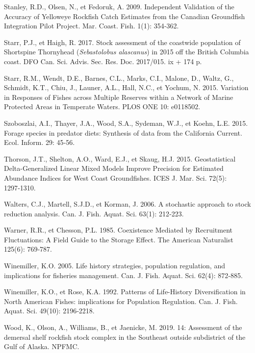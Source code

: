 \documentclass[french,11pt]{book}
\begin{document}
\leavevmode\hypertarget{ref-stanley2009}{}%
Stanley, R.D., Olsen, N., et Fedoruk, A. 2009. Independent Validation of the Accuracy of Yelloweye Rockfish Catch Estimates from the Canadian Groundfish Integration Pilot Project. Mar. Coast. Fish. 1(1): 354‑362.

\leavevmode\hypertarget{ref-starr2017}{}%
Starr, P.J., et Haigh, R. 2017. Stock assessment of the coastwide population of Shortspine Thornyhead (\emph{Sebastolobus alascanus}) in 2015 off the British Columbia coast. DFO Can. Sci. Advis. Sec. Res. Doc. 2017/015. ix + 174 p.

\leavevmode\hypertarget{ref-starr2015}{}%
Starr, R.M., Wendt, D.E., Barnes, C.L., Marks, C.I., Malone, D., Waltz, G., Schmidt, K.T., Chiu, J., Launer, A.L., Hall, N.C., et Yochum, N. 2015. Variation in Responses of Fishes across Multiple Reserves within a Network of Marine Protected Areas in Temperate Waters. PLOS ONE 10: e0118502.

\leavevmode\hypertarget{ref-szoboszlai2015}{}%
Szoboszlai, A.I., Thayer, J.A., Wood, S.A., Sydeman, W.J., et Koehn, L.E. 2015. Forage species in predator diets: Synthesis of data from the California Current. Ecol. Inform. 29: 45‑56.

\leavevmode\hypertarget{ref-thorson2015}{}%
Thorson, J.T., Shelton, A.O., Ward, E.J., et Skaug, H.J. 2015. Geostatistical Delta-Generalized Linear Mixed Models Improve Precision for Estimated Abundance Indices for West Coast Groundfishes. ICES J. Mar. Sci. 72(5): 1297‑1310.

\leavevmode\hypertarget{ref-walters2006}{}%
Walters, C.J., Martell, S.J.D., et Korman, J. 2006. A stochastic approach to stock reduction analysis. Can. J. Fish. Aquat. Sci. 63(1): 212‑223.

\leavevmode\hypertarget{ref-warner1985}{}%
Warner, R.R., et Chesson, P.L. 1985. Coexistence Mediated by Recruitment Fluctuations: A Field Guide to the Storage Effect. The American Naturalist 125(6): 769‑787.

\leavevmode\hypertarget{ref-winemiller2005}{}%
Winemiller, K.O. 2005. Life history strategies, population regulation, and implications for fisheries management. Can. J. Fish. Aquat. Sci. 62(4): 872‑885.

\leavevmode\hypertarget{ref-winemiller1992}{}%
Winemiller, K.O., et Rose, K.A. 1992. Patterns of Life-History Diversification in North American Fishes: implications for Population Regulation. Can. J. Fish. Aquat. Sci. 49(10): 2196‑2218.

\leavevmode\hypertarget{ref-wood2019}{}%
Wood, K., Olson, A., Williams, B., et Jaenicke, M. 2019. 14: Assessment of the demersal shelf rockfish stock complex in the Southeast outside subdistrict of the Gulf of Alaska. NPFMC.
\end{document}
